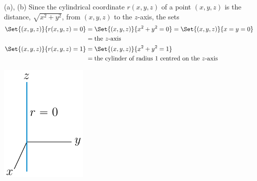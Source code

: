 \begin{solution}
(a), (b) Since the cylindrical coordinate $r(x,y,z)$ of a point $(x,y,z)$ is
the distance, $\sqrt{x^2+y^2}$, from $(x,y,z)$ to the $z$-axis, the sets
\begin{align*}
\Set{(x,y,z)}{r(x,y,z)=0}
&=\Set{(x,y,z)}{x^2+y^2=0}
=\Set{(x,y,z)}{x=y=0} \\
&=\text{the $z$-axis} \\
\Set{(x,y,z)}{r(x,y,z)=1}
&=\Set{(x,y,z)}{x^2+y^2=1} \\
&=\text{the cylinder of radius $1$ centred on the $z$-axis}
\end{align*} 
\begin{center}
   \includegraphics{fig/cylR0.pdf}\qquad\qquad
\end{center}


\end{solution}
